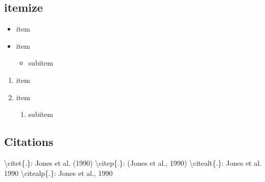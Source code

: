 \documentclass[a4paper, 11pt]{article}
\begin{document}
\subsection{itemize}

\begin{itemize}[noitemsep]
	\item item
	\item item
	\begin{itemize}
		\item subitem
	\end{itemize}
\end{itemize}

\begin{enumerate}
	\item item
	\item item
	\begin{enumerate}
		\item subitem
	\end{enumerate}
\end{enumerate}

\subsection{Citations}
	\textbackslash citet\{.\}:   Jones et al. (1990)
	\textbackslash citep\{.\}:   (Jones et al., 1990)
	\textbackslash citealt\{.\}: Jones et al. 1990
	\textbackslash citealp\{.\}: Jones et al., 1990


\end{document}
